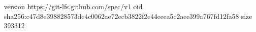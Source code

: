 version https://git-lfs.github.com/spec/v1
oid sha256:c47d8e398828573de4c0062ae72ecb3822f2e44eeea5c2aee399a767fd12fa58
size 393312
